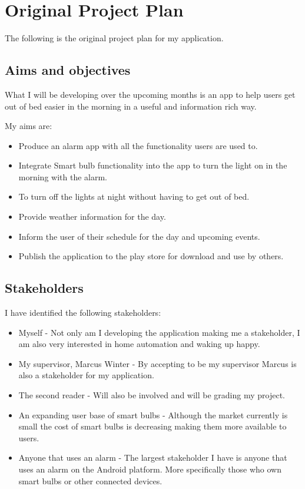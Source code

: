 \section{Original Project Plan}\label{original-project-plan}

The following is the original project plan for my application.

\subsection{Aims and objectives}\label{aims-and-objectives}

What I will be developing over the upcoming months is an app to help
users get out of bed easier in the morning in a useful and information
rich way.

My aims are:

\begin{itemize}
\tightlist
\item
  Produce an alarm app with all the functionality users are used to.
\item
  Integrate Smart bulb functionality into the app to turn the light on
  in the morning with the alarm.
\item
  To turn off the lights at night without having to get out of bed.
\item
  Provide weather information for the day.
\item
  Inform the user of their schedule for the day and upcoming events.
\item
  Publish the application to the play store for download and use by
  others.
\end{itemize}

\subsection{Stakeholders}\label{stakeholders}

I have identified the following stakeholders:

\begin{itemize}
\item
  Myself - Not only am I developing the application making me a
  stakeholder, I am also very interested in home automation and waking
  up happy.
\item
  My supervisor, Marcus Winter - By accepting to be my supervisor Marcus
  is also a stakeholder for my application.
\item
  The second reader - Will also be involved and will be grading my
  project.
\item
  An expanding user base of smart bulbs - Although the market currently
  is small the cost of smart bulbs is decreasing making them more
  available to users.
\item
  Anyone that uses an alarm - The largest stakeholder I have is anyone
  that uses an alarm on the Android platform. More specifically those
  who own smart bulbs or other connected devices.
\end{itemize}

